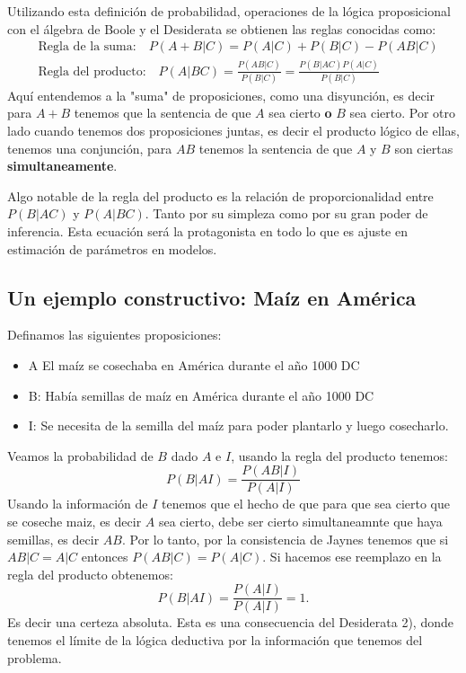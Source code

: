 \documentclass[aps,onecolumn,12pt,notitlepage]{revtex4-1}
\begin{document}
Utilizando esta definición de probabilidad, operaciones  de la lógica proposicional con el álgebra de Boole y el Desiderata se obtienen las reglas conocidas como:
\begin{align}
&\text{Regla de la suma:}\quad P(A + B|C) = P(A|C) + P(B|C) - P(AB|C)\\
&\text{Regla del producto:}\quad P(A|BC) = \frac{P(AB|C)}{P(B|C)} = \frac{P(B|AC)P(A|C)}{P(B|C)} 
\end{align}
Aquí entendemos a la "suma" de proposiciones, como una disyunción, es decir para $A+B$ tenemos que la sentencia de que $A$ sea cierto \textbf{o} $B$ sea cierto. Por otro lado cuando tenemos dos proposiciones juntas, es decir el producto lógico de ellas, tenemos una conjunción, para $AB$ tenemos la sentencia de que $A$ y $B$ son ciertas \textbf{simultaneamente}. 

Algo notable de la regla del producto es la relación de proporcionalidad entre $P(B|AC)$ y $P(A|BC)$. Tanto por su simpleza como por su gran poder de inferencia. Esta ecuación será la protagonista en todo lo que es ajuste en estimación de parámetros en modelos.

\subsection{Un ejemplo constructivo: Maíz en América}

Definamos las siguientes proposiciones:
\begin{itemize}
\item{A} El maíz se cosechaba en América durante el año 1000 DC
\item{B}: Había semillas de maíz en América durante el año 1000 DC
\item{I}: Se necesita de la semilla del maíz para poder plantarlo y luego cosecharlo.
\end{itemize}

Veamos la probabilidad de $B$ dado $A$ e $I$, usando la regla del producto tenemos:
\begin{equation}
P(B|AI) = \frac{P(AB|I)}{P(A|I)} 
\end{equation}
Usando la información de $I$ tenemos que el hecho de que para que sea cierto que se coseche maiz, es decir $A$ sea cierto, debe ser cierto simultaneamnte que haya semillas, es decir $AB$. Por lo tanto, por la consistencia de Jaynes tenemos que si $AB|C  = A|C$  entonces $P(AB|C) =P(A|C)$. Si hacemos ese reemplazo en la regla del producto obtenemos:
\begin{equation}
P(B|AI) = \frac{P(A|I)}{P(A|I)} = 1.
\end{equation}
Es decir una certeza absoluta. Esta es una consecuencia del Desiderata 2), donde tenemos el límite de la lógica deductiva por la información que tenemos del problema.
\end{document}
